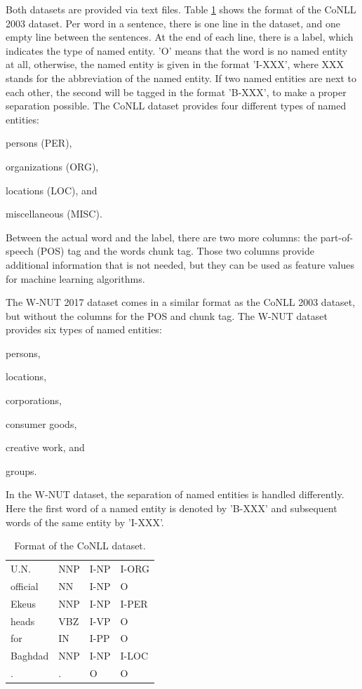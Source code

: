 \documentclass[12pt]{book}
\begin{document}
	Both datasets are provided via text files. Table \ref{tab:format} shows the format of the CoNLL 2003 dataset. Per word in a sentence, there is one line in the dataset, and one empty line between the sentences. At the end of each line, there is a label, which indicates the type of named entity. 'O' means that the word is no named entity at all, otherwise, the named entity is given in the format 'I-XXX', where XXX stands for the abbreviation of the named entity. If two named entities are next to each other, the second will be tagged in the format 'B-XXX', to make a proper separation possible. The CoNLL dataset provides four different types of named entities: \begin{enumerate*}
		\item persons (PER),
		\item organizations (ORG),
		\item locations (LOC), and
		\item miscellaneous (MISC).
	\end{enumerate*}
	Between the actual word and the label, there are two more columns: the part-of-speech (POS) tag and the words chunk tag. Those two columns provide additional information that is not needed, but they can be used as feature values for machine learning algorithms. 
	
	The W-NUT 2017 dataset comes in a similar format as the CoNLL 2003 dataset, but without the columns for the POS and chunk tag. The W-NUT dataset provides six types of named entities: 
	\begin{enumerate*}
		\item persons,
		\item locations,
		\item corporations,
		\item consumer goods,
		\item creative work, and
		\item groups.
	\end{enumerate*}
In the W-NUT dataset, the separation of named entities is handled differently. Here the first word of a named entity is denoted by 'B-XXX' and subsequent words of the same entity by 'I-XXX'.
	
	\begin{center}
	\begin{table}
		\centering
		\begin{tabular}{l l l l}
			U.N. & NNP & I-NP & I-ORG 
			\\
			official & NN & I-NP & O 
			\\
			Ekeus & NNP & I-NP & I-PER \\ 
			heads & VBZ & I-VP & O 
			\\
			for & IN & I-PP & O \\
			Baghdad & NNP & I-NP & I-LOC \\ 
			. & . & O & O \\
		\end{tabular}
		\caption{Format of the CoNLL dataset.}
		\label{tab:format}
	\end{table}
	\end{center}
	
\end{document}
